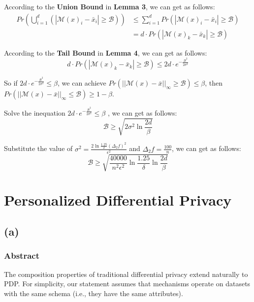 \documentclass[a4paper,12pt]{article}
\begin{document}
According to the \textbf{Union Bound} in \textbf{Lemma 3}, we can get as follows:
\begin{equation}
    \begin{aligned}
        Pr(\bigcup_{i = 1}^{d}(|\mathcal{M}(x)_i - \bar{x}_i| \geq \mathcal{B})) & \leq \sum_{i = 1}^{d}Pr(|\mathcal{M}(x)_i - \bar{x}_i| \geq \mathcal{B}) \\
                                                                                 & = d\cdot Pr(|\mathcal{M}(x)_k - \bar{x}_k| \geq \mathcal{B})
    \end{aligned}
\end{equation}

According to the \textbf{Tail Bound} in \textbf{Lemma 4}, we can get as follows:
\begin{equation}
    d\cdot Pr(|\mathcal{M}(x)_k - \bar{x}_k| \geq \mathcal{B}) \leq 2d\cdot e^{-\frac{\mathcal{B}^2}{2\sigma^2}}
\end{equation}

So if $2d\cdot e^{-\frac{\mathcal{B}^2}{2\sigma^2}} \leq \beta$, we can achieve $Pr(||\mathcal{M}(x) - \bar{x}||_{\infty} \geq \mathcal{B}) \leq \beta$, then $Pr(||\mathcal{M}(x) - \bar{x}||_{\infty} \leq \mathcal{B}) \geq 1 - \beta$.

Solve the inequation $2d\cdot e^{-\frac{\mathcal{B}^2}{2\sigma^2}} \leq \beta$ , we can get as follows:
\begin{equation}
    \mathcal{B} \geq \sqrt{2\sigma^2\ln{\frac{2d}{\beta}}}
\end{equation}

Substitute the value of $\sigma^2 = \frac{2\ln{\frac{1.25}{\delta}}(\Delta_{2}f)^2}{\epsilon^2}$ and $\Delta_{2}f = \frac{100}{n}$, we can get as follows:
\begin{equation}
    \mathcal{B} \geq \sqrt{\frac{40000}{n^2\epsilon^2}\ln{\frac{1.25}{\delta}}\ln{\frac{2d}{\beta}}}
\end{equation}

\section{Personalized Differential Privacy}
\subsection{(a)}
\subsubsection{Abstract}
The composition properties of traditional differential privacy extend naturally to PDP. For simplicity, our statement assumes that mechanisms operate on datasets with the same schema (i.e., they have the same attributes).
\end{document}

